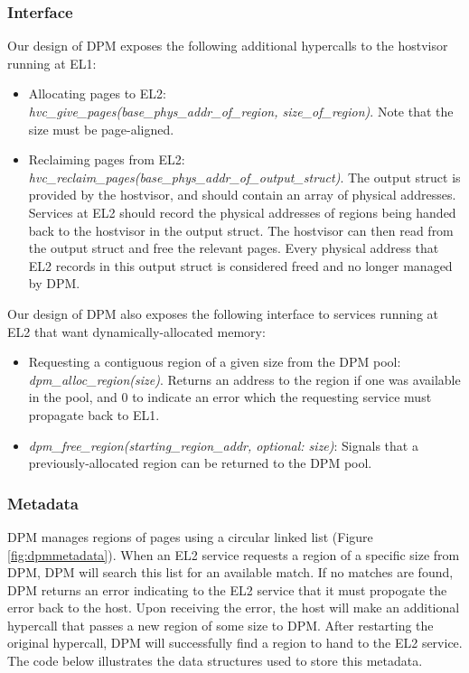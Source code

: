 \subsubsection{Interface}
Our design of DPM exposes the following additional hypercalls to the
hostvisor running at EL1:

\begin{itemize}
\item Allocating pages to EL2:\\
\textit{hvc\_give\_pages(base\_phys\_addr\_of\_region, size\_of\_region)}.
Note that the size must be page-aligned.
\item Reclaiming pages from EL2:\\
\textit{hvc\_reclaim\_pages(base\_phys\_addr\_of\_output\_struct)}.
The output struct is provided by the hostvisor, and should contain an array of
physical addresses. Services at EL2 should record the physical addresses
of  regions being handed back to the hostvisor in the output
struct. The hostvisor can then read from the output struct and free the relevant pages.
Every physical address that EL2 records in this output struct is considered
freed and no longer managed by DPM.
\end{itemize}

\noindent Our design of DPM also exposes the following interface to services running
at EL2 that want dynamically-allocated memory:
\begin{itemize}
\item Requesting a contiguous region of a given size from the DPM pool:
\textit{dpm\_alloc\_region(size)}.
	Returns an address to the region if one was available in the pool,
    and 0 to indicate an error which the requesting service must propagate back to EL1.
\item
\textit{dpm\_free\_region(starting\_region\_addr, optional: size)}:
Signals that a previously-allocated region can be returned to the DPM pool.
\end{itemize}

\subsubsection{Metadata}

DPM manages regions of pages using a circular linked list (Figure \ref{fig:dpmmetadata}). When an EL2 service requests
a region of a specific size from DPM, DPM will search this list for an available match.
If no matches are found, DPM returns an error indicating to the EL2 service that it must
propogate the error back to the host. Upon receiving the error, the host will make an
additional hypercall that passes a new region of some size to DPM. After restarting the original
hypercall, DPM will successfully find a region to hand to the EL2 service. The code
below illustrates the data structures used to store this metadata.

